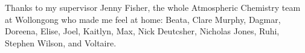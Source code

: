 \begin{acknowledgements}
  \addchaptertocentry{\acknowledgementname} %
  
  Thanks to my supervisor Jenny Fisher, the whole Atmospheric Chemistry team at Wollongong who made me feel at home: Beata, Clare Murphy, Dagmar, Doreena, Elise, Joel, Kaitlyn, Max, Nick Deutcsher, Nicholas Jones, Ruhi, Stephen Wilson, and Voltaire. 


\end{acknowledgements}